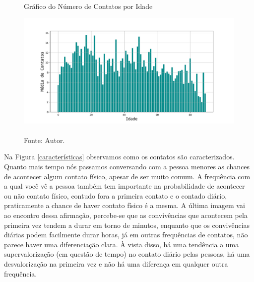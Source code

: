 \begin{figure}[H]
  \centering
  \captionsetup{font=normalsize,skip=1pt,singlelinecheck=on,labelsep=endash}

  \caption{Gráfico do Número de Contatos por Idade}

  \includegraphics[scale=0.5]{./img/idade_contatos.jpg}
  \captionsetup{font=small,position=below,skip=-1pt}
   \caption*{\\Fonte: Autor.}
   \label{M_Idade}
\end{figure}

Na Figura \ref{características} observamos como os contatos são caracterizados. Quanto mais tempo nós passamos conversando com a pessoa menores as chances de acontecer algum contato físico, apesar de ser muito comum. A frequência com a qual você vê a pessoa também tem importante na probabilidade de acontecer ou não contato físico, contudo fora a primeira contato e o contado diário, praticamente a chance de haver contato físico é a mesma. A última imagem vai ao encontro dessa afirmação, percebe-se que as convivências que acontecem pela primeira vez tendem a durar em torno de minutos, enquanto que os convivências diárias podem facilmente durar horas, já em outras frequências de contatos, não parece haver uma diferenciação clara. À vista disso, há uma tendência a uma supervalorização (em questão de tempo) no contato diário pelas pessoas, há uma desvalorização na primeira vez e não há uma diferença em qualquer outra frequência.


